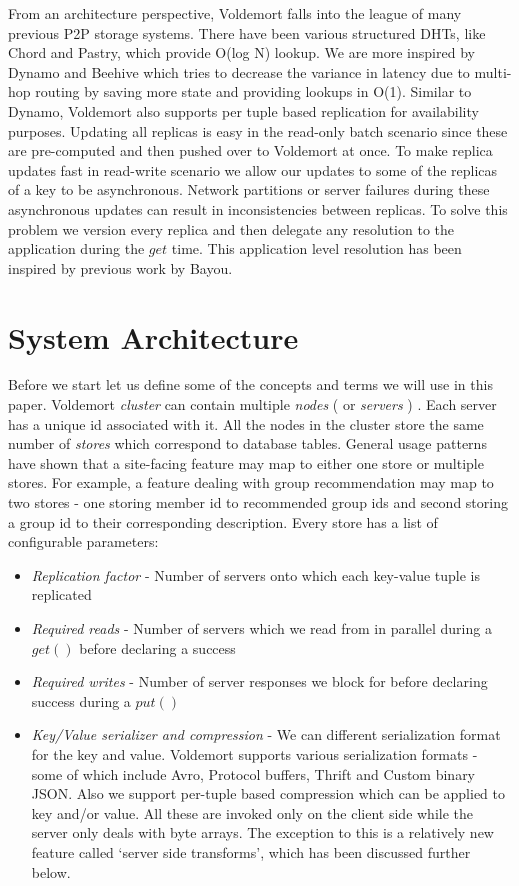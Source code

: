 \documentclass[10pt,twocolumn,preprint,natbib,authoryear]{sigplanconf}
\begin{document}
From an architecture perspective, Voldemort falls into the league of many previous P2P storage systems. There have been various structured DHTs, like Chord and Pastry, which provide O(log N) lookup. We are more inspired by Dynamo and Beehive which tries to decrease the variance in latency due to multi-hop routing by saving more state and providing lookups in O(1). Similar to Dynamo, Voldemort also supports per tuple based replication for availability purposes. Updating all replicas is easy in the read-only batch scenario since these are pre-computed and then pushed over to Voldemort at once. To make replica updates fast in read-write scenario we allow our updates to some of the replicas of a key to be asynchronous. Network partitions or server failures during these asynchronous updates can result in inconsistencies between replicas. To solve this problem we version every replica and then delegate any resolution to the application during the $get$ time. This application level resolution has been inspired by previous work by Bayou\cite{http://www2.parc.com/csl/projects/bayou/pubs/uist-97/Bayou.pdf}. 


\section{System Architecture}
\label{sec:system_architecture}

Before we start let us define some of the concepts and terms we will use in this paper. Voldemort \emph{cluster} can contain multiple \emph{nodes} ( or \emph{servers} ) . Each server has a unique id associated with it. All the nodes in the cluster store the same number of \emph{stores} which correspond to database tables. General usage patterns have shown that a site-facing feature may map to either one store or multiple stores. For example, a feature dealing with group recommendation may map to two stores - one storing member id to recommended group ids and second storing a group id to their corresponding description. Every store has a list of configurable parameters:
\begin{itemize}
	\item \emph {Replication factor} - Number of servers onto which each key-value tuple is replicated 
	\item \emph {Required reads} - Number of servers which we read from in parallel during a $get()$ before declaring a success
	\item \emph {Required writes} - Number of server responses we block for before declaring success during a $put()$
	\item \emph {Key/Value serializer and compression} - We can different serialization format for the key and value. Voldemort supports various serialization formats - some of which include Avro, Protocol buffers, Thrift and Custom binary JSON. Also we support per-tuple based compression which can be applied to key and/or value. All these are invoked only on the client side while the server only deals with byte arrays. The exception to this is a relatively new feature called `server side transforms', which has been discussed further below. 
\end{itemize}
\end{document}
